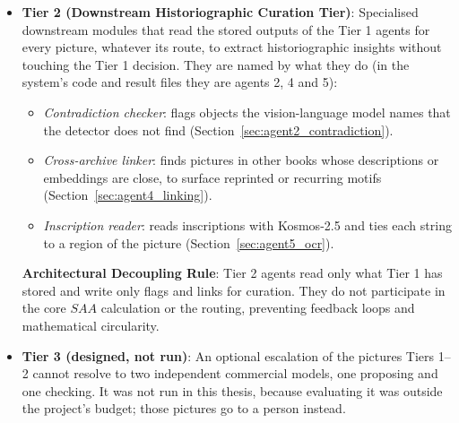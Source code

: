\documentclass[12pt,a4paper]{report}
\begin{document}
\begin{itemize}
    \paragraph{Which object and scene classes are covered.} The detector was trained on ten object classes. Every evaluation in this thesis reports the eight that the human boxes and the detector share: \textit{person, child, animal, building, weapon, vehicle, tree, text} (horses are merged into \textit{animal}; the rater's \textit{furniture} and \textit{hat} boxes never reached the label files). The scene classifier is zero-shot, but it is evaluated against five scene types: \textit{drawing, landscape, family, playing, teaching}.

    \item \textbf{Tier 2 (Downstream Historiographic Curation Tier)}: Specialised downstream modules that read the stored outputs of the Tier 1 agents for every picture, whatever its route, to extract historiographic insights without touching the Tier 1 decision. They are named by what they do (in the system's code and result files they are agents 2, 4 and 5):
    \begin{itemize}
        \item \textit{Contradiction checker}: flags objects the vision-language model names that the detector does not find (Section~\ref{sec:agent2_contradiction}).
        \item \textit{Cross-archive linker}: finds pictures in other books whose descriptions or embeddings are close, to surface reprinted or recurring motifs (Section~\ref{sec:agent4_linking}).
        \item \textit{Inscription reader}: reads inscriptions with Kosmos-2.5 and ties each string to a region of the picture (Section~\ref{sec:agent5_ocr}).
    \end{itemize}
    \begin{flushleft}
    \textbf{Architectural Decoupling Rule}: Tier 2 agents read only what Tier 1 has stored and write only flags and links for curation. They do not participate in the core $SAA$ calculation or the routing, preventing feedback loops and mathematical circularity.
    \end{flushleft}
    
    \item \textbf{Tier 3 (designed, not run)}: An optional escalation of the pictures Tiers 1--2 cannot resolve to two independent commercial models, one proposing and one checking. It was not run in this thesis, because evaluating it was outside the project's budget; those pictures go to a person instead.
\end{itemize}
\end{document}

